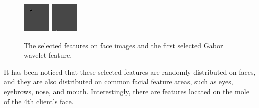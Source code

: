 \documentclass[a4paper,10pt]{article}
\begin{document}
\begin{figure}[ht]
 \includegraphics[width=\textwidth*11/100]{figures/firstgabor_Full_7.png}
 \includegraphics[width=\textwidth*11/100]{figures/firstgabor_Full_8.png}
\caption{The selected features on face images and the first selected Gabor wavelet feature.}
\label{fig:resultBGC1toC8full}
\end{figure} 
It has been noticed that these selected features are randomly distributed on faces, and they are also distributed on common facial feature areas, such as eyes, eyebrows, nose, and mouth. Interestingly, there are features located on the mole of the 4th client's face. 
\end{document}
